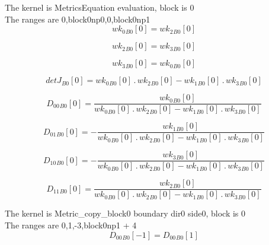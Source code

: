 \documentclass{article}
\begin{document}
\noindent The kernel is MetricsEquation evaluation, block is 0\\\noindent The ranges are 0,block0np0,0,block0np1\\\begin{dmath}{wk_{0}{_{B0}}}[{0}] = {wk_{2}{_{B0}}}[{0}]\end{dmath}

\begin{dmath}{wk_{2}{_{B0}}}[{0}] = {wk_{3}{_{B0}}}[{0}]\end{dmath}

\begin{dmath}{wk_{3}{_{B0}}}[{0}] = {wk_{0}{_{B0}}}[{0}]\end{dmath}

\begin{dmath}{detJ{_{B0}}}[{0}] = {wk_{0}{_{B0}}}[{0}] \,.\, {wk_{2}{_{B0}}}[{0}] - {wk_{1}{_{B0}}}[{0}] \,.\, {wk_{3}{_{B0}}}[{0}]\end{dmath}

\begin{dmath}{D_{00}{_{B0}}}[{0}] = \frac{{wk_{0}{_{B0}}}[{0}]}{{wk_{0}{_{B0}}}[{0}] \,.\, {wk_{2}{_{B0}}}[{0}] - {wk_{1}{_{B0}}}[{0}] \,.\, {wk_{3}{_{B0}}}[{0}]}\end{dmath}

\begin{dmath}{D_{01}{_{B0}}}[{0}] = - \frac{{wk_{1}{_{B0}}}[{0}]}{{wk_{0}{_{B0}}}[{0}] \,.\, {wk_{2}{_{B0}}}[{0}] - {wk_{1}{_{B0}}}[{0}] \,.\, {wk_{3}{_{B0}}}[{0}]}\end{dmath}

\begin{dmath}{D_{10}{_{B0}}}[{0}] = - \frac{{wk_{3}{_{B0}}}[{0}]}{{wk_{0}{_{B0}}}[{0}] \,.\, {wk_{2}{_{B0}}}[{0}] - {wk_{1}{_{B0}}}[{0}] \,.\, {wk_{3}{_{B0}}}[{0}]}\end{dmath}

\begin{dmath}{D_{11}{_{B0}}}[{0}] = \frac{{wk_{2}{_{B0}}}[{0}]}{{wk_{0}{_{B0}}}[{0}] \,.\, {wk_{2}{_{B0}}}[{0}] - {wk_{1}{_{B0}}}[{0}] \,.\, {wk_{3}{_{B0}}}[{0}]}\end{dmath}

\noindent The kernel is Metric_copy_block0 boundary dir0 side0, block is 0\\\noindent The ranges are 0,1,-3,block0np1 + 4\\\begin{dmath}{D_{00}{_{B0}}}[{-1}] = {D_{00}{_{B0}}}[{1}]\end{dmath}
\end{document}
